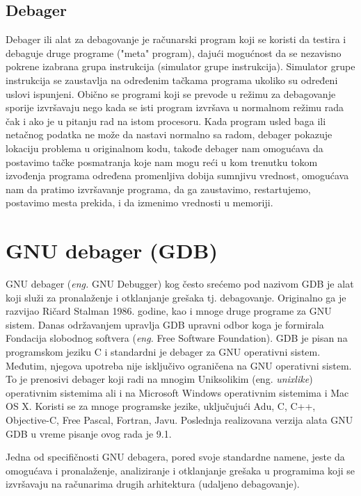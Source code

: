 \documentclass[a4paper]{article}
\begin{document}
\subsection{Debager}
\label{subsec:debager}
Debager ili alat za debagovanje je računarski program koji se koristi da testira i 
debaguje druge programe ("meta" program), dajući mogućnost da se nezavisno 
pokrene izabrana grupa instrukcija (simulator grupe instrukcija). Simulator grupe instrukcija se zaustavlja
na određenim tačkama programa ukoliko su određeni uslovi ispunjeni.
Obično se programi koji se prevode u režimu za debagovanje
sporije izvršavaju nego kada se isti program izvršava u normalnom režimu rada čak i ako je 
u pitanju rad na istom procesoru. \cite{debugger} Kada program usled baga ili netačnog podatka ne može da 
nastavi normalno sa radom, debager pokazuje lokaciju problema u originalnom kodu, takođe
debager nam omogućava da postavimo tačke posmatranja koje nam
mogu reći u kom trenutku tokom izvođenja programa 
određena promenljiva dobija sumnjivu vrednost, omogućava nam da
pratimo izvršavanje programa, da ga zaustavimo, restartujemo,
postavimo mesta prekida, i da izmenimo vrednosti u memoriji. 

\section{GNU debager (GDB)}
\label{sec:GDB}
GNU debager (\textit{eng.} GNU Debugger) kog često srećemo pod nazivom GDB je alat koji služi za pronalaženje 
i otklanjanje grešaka tj. debagovanje. Originalno ga je razvijao Ričard Stalman 1986. godine, kao i mnoge druge programe za GNU sistem\cite{gdb}. Danas održavanjem upravlja GDB upravni odbor koga je formirala Fondacija 
slobodnog softvera (\textit{eng.} Free Software Foundation).
GDB je pisan na programskom jeziku C i standardni je debager za GNU operativni sistem. 
Međutim, njegova upotreba nije isključivo ograničena na GNU operativni sistem. To je prenosivi debager
koji radi na mnogim Uniksolikim (eng. \textit{unixlike}) operativnim sistemima ali i na Microsoft Windows operativnim 
sistemima i Mac OS X. Koristi se za mnoge programske jezike, uključujući
Adu, C, C++, Objective-C, Free Pascal, Fortran, Javu.
Poslednja realizovana verzija alata GNU GDB u vreme pisanje ovog rada je 9.1. \cite{sourceware}

Jedna od specifičnosti GNU debagera, pored svoje standardne namene, jeste da omogućava i 
pronalaženje, analiziranje i otklanjanje grešaka u programima koji se izvršavaju na računarima drugih 
arhitektura (udaljeno debagovanje)\cite{master_rad}.
\end{document}
